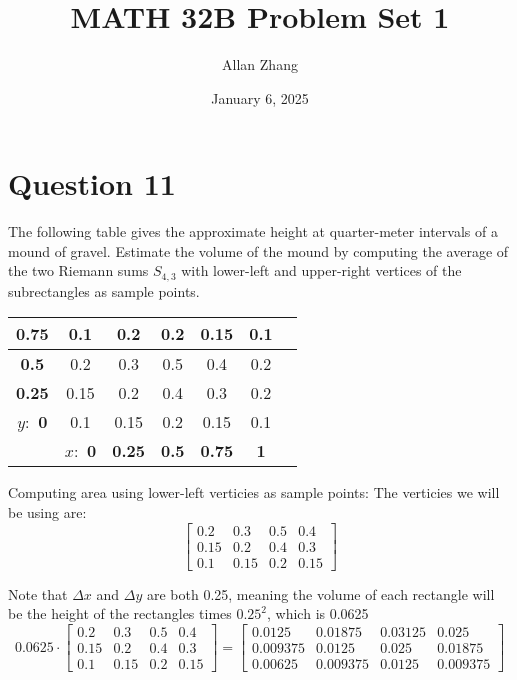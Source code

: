 \documentclass[hidelinks]{article}
\title{\textbf{MATH 32B Problem Set 1}}
\author{Allan Zhang}
\date{January 6, 2025}
\begin{document}
\hypersetup{bookmarksnumbered=true,}
\pagecolor{white}
\color{black}
\maketitle

\section{Question 11}
The following table gives the approximate height at quarter-meter intervals of a mound of gravel. Estimate the volume of the mound by computing the average of the two Riemann sums $S_{4,3}$ with lower-left and upper-right vertices of the subrectangles as sample points.

\begin{center}
\renewcommand{\arraystretch}{1.5} %
\setlength{\tabcolsep}{10pt} %
\begin{tabular}{|c|c|c|c|c|c|c|}
\hline
\textbf{0.75} & 0.1  & 0.2  & 0.2  & 0.15 & 0.1  \\ \hline
 \textbf{0.5} & 0.2  & 0.3  & 0.5  & 0.4  & 0.2  \\ \hline
 \textbf{0.25}& 0.15 & 0.2  & 0.4  & 0.3  & 0.2  \\ \hline
 \textbf{$y:$ 0}    & 0.1  & 0.15 & 0.2  & 0.15 & 0.1  \\ \hline
& \textbf{$x:$ 0} & \textbf{0.25} & \textbf{0.5}  & \textbf{0.75} & \textbf{1}    \\ \hline
\end{tabular}
\end{center}

Computing area using lower-left verticies as sample points:
The verticies we will be using are: 
\[\begin{bmatrix}
	0.2 & 0.3 & 0.5 & 0.4 \\ 
	0.15 & 0.2 & 0.4  & 0.3\\
	0.1 & 0.15 & 0.2  & 0.15
\end{bmatrix}\]

Note that $\Delta x$ and $\Delta y$ are both 0.25, meaning the volume of each rectangle will be the height of the rectangles times $0.25^2$, which is 0.0625
\[ 0.0625 \cdot \begin{bmatrix}
	0.2 & 0.3 & 0.5 & 0.4 \\ 
	0.15 & 0.2 & 0.4  & 0.3\\
	0.1 & 0.15 & 0.2  & 0.15
\end{bmatrix} = \begin{bmatrix}
	0.0125 & 0.01875 & 0.03125 & 0.025 \\ 
	0.009375 & 0.0125 & 0.025  & 0.01875\\
	0.00625 & 0.009375 & 0.0125  & 0.009375
\end{bmatrix} \]
\end{document}
